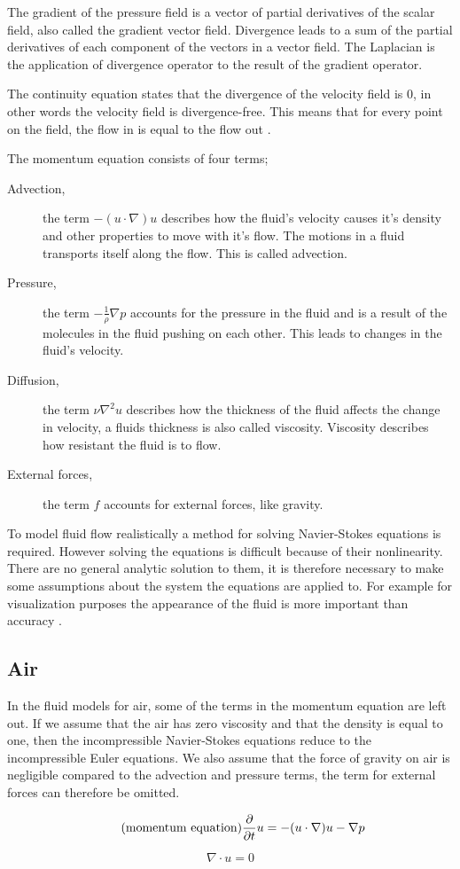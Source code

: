 The gradient of the pressure field is a vector of partial derivatives of the 
scalar field, also called the gradient vector field. Divergence leads to a sum of 
the partial derivatives of each component of the vectors in a vector field. The 
Laplacian is the application of divergence operator to the result of the gradient 
operator. 

The continuity equation states that the divergence of the 
velocity field is 0, in other words the velocity field is divergence-free. This 
means that for every point on the field, the flow in is equal to the flow out
\cite{originalSnowThesis}. 

The momentum equation consists of four terms;
\begin{description}
	\item[Advection,] the term $-(u \cdot \nabla)u$ describes how the fluid's 
	velocity causes it's density and other properties to move with it's flow. 
	The motions in a fluid transports itself along the flow. This is called 
	advection. 
	\item[Pressure,] the term $-\frac{1}{\rho}\nabla p$ accounts for the pressure 
	in the fluid and is a result of the molecules in the fluid pushing on each 
	other. This leads to changes in the fluid's velocity. 
	\item[Diffusion,] the term $\nu \nabla^2 u$ describes how the thickness of the 
	fluid affects the change in velocity, a fluids thickness is also called viscosity. 
	Viscosity describes how resistant the fluid is to flow. 
	\item[External forces,] the term $f$ accounts for external forces, like gravity.
\end{description}

To model fluid flow realistically a method for solving Navier-Stokes equations is 
required. However solving the equations is difficult because of their nonlinearity. 
There are no general analytic solution to them, it is therefore necessary to make 
some assumptions about the system the equations are applied to. For example for 
visualization purposes the appearance of the fluid is more important than accuracy 
\cite{smokeAndFire}. 

\subsection{Air}

In the fluid models for air, some of the terms in the momentum equation are left 
out. If we assume that the air has zero viscosity and that the density is equal 
to one, then the incompressible Navier-Stokes equations reduce to the incompressible 
Euler equations. We also assume that the force of gravity on air is negligible 
compared to the advection and pressure terms, the term for external forces can 
therefore be omitted\cite{originalSnowThesis}. 

\begin{equation} 
	\tag{momentum equation}
	\frac{\partial}{\partial t}u  = -(u \cdot \nabla)u - \nabla p
\end{equation}

\begin{equation}
	\tag{continuity equation}
	\nabla \cdot u = 0
\end{equation}
